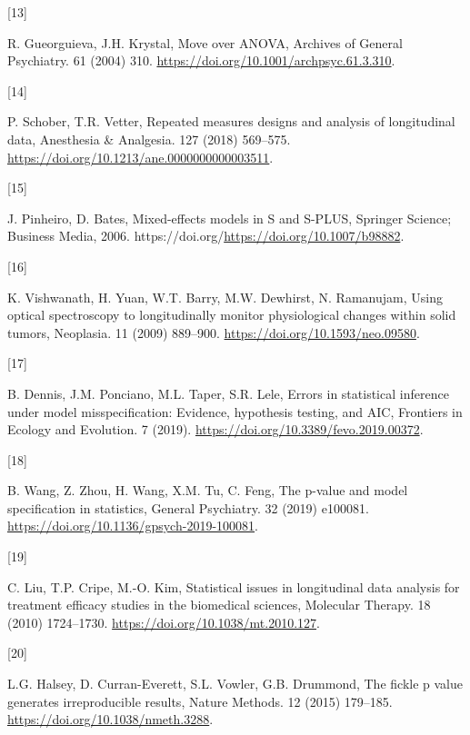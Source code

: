 \documentclass[
]{article}
\newlength{\cslhangindent}
\newlength{\csllabelwidth}
\newlength{\cslentryspacingunit} %
\newenvironment{CSLReferences}[2] %
 {%
  \setlength{\parindent}{0pt}
  \ifodd #1
  \let\oldpar\par
  \def\par{\hangindent=\cslhangindent\oldpar}
  \fi
  \setlength{\parskip}{#2\cslentryspacingunit}
 }%
 {}
\newcommand{\CSLLeftMargin}[1]{\parbox[t]{\csllabelwidth}{#1}}
\newcommand{\CSLRightInline}[1]{\parbox[t]{\linewidth - \csllabelwidth}{#1}\break}
\begin{document}
\begin{CSLReferences}{0}{0}
\leavevmode{}%
\CSLLeftMargin{{[}13{]} }
\CSLRightInline{R. Gueorguieva, J.H. Krystal, Move over {ANOVA}, Archives of General Psychiatry. 61 (2004) 310. \url{https://doi.org/10.1001/archpsyc.61.3.310}.}

\leavevmode{}%
\CSLLeftMargin{{[}14{]} }
\CSLRightInline{P. Schober, T.R. Vetter, Repeated measures designs and analysis of longitudinal data, Anesthesia {\&} Analgesia. 127 (2018) 569--575. \url{https://doi.org/10.1213/ane.0000000000003511}.}

\leavevmode{}%
\CSLLeftMargin{{[}15{]} }
\CSLRightInline{J. Pinheiro, D. Bates, {Mixed-effects models in S and S-PLUS}, Springer Science; Business Media, 2006. https://doi.org/\url{https://doi.org/10.1007/b98882}.}

\leavevmode{}%
\CSLLeftMargin{{[}16{]} }
\CSLRightInline{K. Vishwanath, H. Yuan, W.T. Barry, M.W. Dewhirst, N. Ramanujam, Using optical spectroscopy to longitudinally monitor physiological changes within solid tumors, Neoplasia. 11 (2009) 889--900. \url{https://doi.org/10.1593/neo.09580}.}

\leavevmode{}%
\CSLLeftMargin{{[}17{]} }
\CSLRightInline{B. Dennis, J.M. Ponciano, M.L. Taper, S.R. Lele, Errors in statistical inference under model misspecification: Evidence, hypothesis testing, and {AIC}, Frontiers in Ecology and Evolution. 7 (2019). \url{https://doi.org/10.3389/fevo.2019.00372}.}

\leavevmode{}%
\CSLLeftMargin{{[}18{]} }
\CSLRightInline{B. Wang, Z. Zhou, H. Wang, X.M. Tu, C. Feng, The p-value and model specification in statistics, General Psychiatry. 32 (2019) e100081. \url{https://doi.org/10.1136/gpsych-2019-100081}.}

\leavevmode{}%
\CSLLeftMargin{{[}19{]} }
\CSLRightInline{C. Liu, T.P. Cripe, M.-O. Kim, Statistical issues in longitudinal data analysis for treatment efficacy studies in the biomedical sciences, Molecular Therapy. 18 (2010) 1724--1730. \url{https://doi.org/10.1038/mt.2010.127}.}

\leavevmode{}%
\CSLLeftMargin{{[}20{]} }
\CSLRightInline{L.G. Halsey, D. Curran-Everett, S.L. Vowler, G.B. Drummond, The fickle p value generates irreproducible results, Nature Methods. 12 (2015) 179--185. \url{https://doi.org/10.1038/nmeth.3288}.}


\end{CSLReferences}
\end{document}

